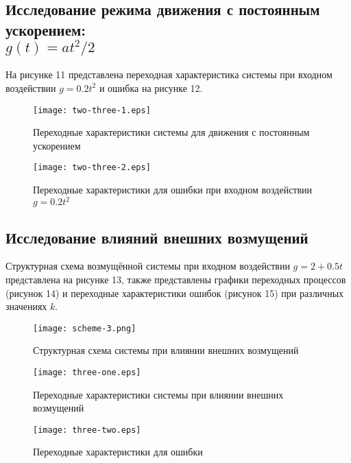\documentclass[a4paper,12pt]{article} %
\begin{document}
\subsection{Исследование режима движения с постоянным ускорением: \\$g(t)=at^2/2$} 
На рисунке 11 представлена переходная характеристика системы при входном воздействии $g=0.2t^2$ и ошибка на рисунке 12.
\begin{figure}[H]
	\centering
	\texttt{[image: two-three-1.eps]}
	\caption{Переходные характеристики системы для движения с постоянным ускорением}
\end{figure}
\begin{figure}[H]
	\centering
	\texttt{[image: two-three-2.eps]}
	\caption{Переходные характеристики для ошибки при входном воздействии $g=0.2t^2$}
\end{figure}
\newpage
\begin{center}
\section{Исследование влияний внешних возмущений}
\end{center}\par
Структурная схема возмущённой системы при входном воздействии $g=2+0.5t$ представлена на рисунке 13, также представлены графики переходных процессов (рисунок 14) и переходные характеристики ошибок (рисунок 15) при различных значениях $k$.
\begin{figure}[H]
    \centering
    \texttt{[image: scheme-3.png]}
    \caption{Структурная схема системы при влиянии внешних возмущений}
\end{figure}
\begin{figure}[H]
    \centering
    \texttt{[image: three-one.eps]}
    \caption{Переходные характеристики системы при влиянии внешних возмущений}
\end{figure}
\begin{figure}[H]
    \centering
    \texttt{[image: three-two.eps]}
    \caption{Переходные характеристики для ошибки}
\end{figure}
\end{document}
